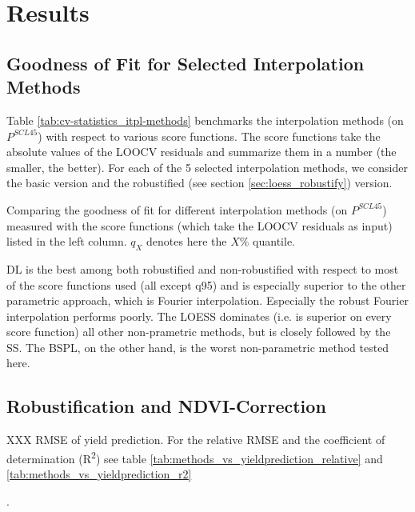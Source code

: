 \chapter{Results}

\section{Goodness of Fit for Selected Interpolation Methods}{
	\label{sec:results_itpl}
	Table \ref{tab:cv-statistics_itpl-methods} benchmarks the interpolation methods (on $P^{SCL45}$) with respect to various score functions. The score functions take the absolute values of the LOOCV residuals and summarize them in a number (the smaller, the better). For each of the 5 selected interpolation methods, we consider the basic version and the robustified (see section \ref{sec:loess_robustify}) version.

	\begin{table}[h]
		\begin{center}
			\caption{Comparing the goodness of fit for different interpolation methods (on $P^{SCL45}$) measured with the score functions (which take the LOOCV residuals as input) listed in the left column. $q_X$ denotes here the $X\%$ quantile.}
			\scriptsize
			
			\normalsize
			\label{tab:cv-statistics_itpl-methods}
		\end{center}
	\end{table}
	
	DL is the best among both robustified and non-robustified with respect to most of the score functions used (all except q95) and is especially superior to the other parametric approach, which is Fourier interpolation. Especially the robust Fourier interpolation performs poorly. The LOESS dominates (i.e. is superior on every score function) all other non-prametric methods, but is closely followed by the SS. The BSPL, on the other hand, is the worst non-parametric method tested here. 
}


\section{Robustification and NDVI-Correction} \label{sec:results_ndvi_corr}
\begin{table}
	\begin{center}
		\caption{XXX RMSE of yield prediction. For the relative RMSE and the coefficient of determination (R\textsuperscript{2}) see table \ref{tab:methods_vs_yieldprediction_relative} and \ref{tab:methods_vs_yieldprediction_r2}}.
		\small
		
		\label{tab:methods_vs_yieldprediction}
		\normalsize
	\end{center}
\end{table}





